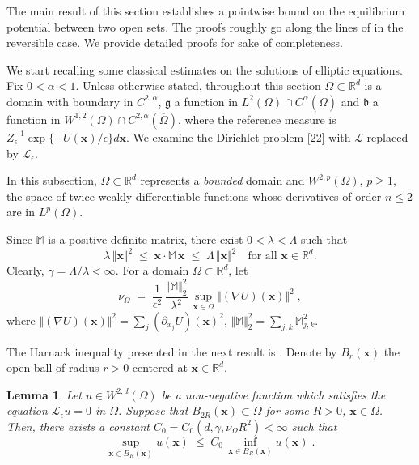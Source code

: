 \documentclass[reqno]{amsart}
\newtheorem{lemma}[theorem]{Lemma}
\newcounter{as}[section]
\newcommand{\mc}[1]{{\mathcal #1}}
\newcommand{\mf}[1]{{\mathfrak #1}}
\newcommand{\bb}[1]{{\mathbb #1}}
\newcommand{\bs}[1]{{\boldsymbol #1}}
\newcommand{\<}{\langle}
\renewcommand{\>}{\rangle}
\begin{document}
The main result of this section establishes a pointwise bound on the equilibrium potential between two open sets. The proofs roughly go along the lines of \cite{BEGK1} in the reversible case. We provide detailed proofs for sake of completeness.

We start recalling some classical estimates on the solutions of
elliptic equations.  Fix $0<\alpha<1$. Unless otherwise stated,
throughout this section $\Omega\subset \bb R^d$ is a domain with
boundary in $C^{2,\alpha}$, $\mf g$ a function in $L^2(\Omega) \cap
C^{\alpha}(\overline{\Omega})$ and $\mf b$ a function in
$W^{1,2}(\Omega)\cap C^{2,\alpha}(\overline{\Omega})$, where the
reference measure is $Z^{-1}_\epsilon \exp\{-U(\bs{x})/\epsilon\}
d\bs{x}$. We examine the Dirichlet problem \eqref{22} with $\mc L$
replaced by $\mc L_\epsilon$.

\smallskip{}  In this
subsection, $\Omega\subset\bb R^d$ represents a {\sl bounded} domain and
$W^{2,p} (\Omega)$, $p\ge 1$, the space of twice weakly differentiable
functions whose derivatives of order $n\le 2$ are in $L^p(\Omega)$.

Since $\bb M$ is a positive-definite matrix, there exist $0<\lambda <
\Lambda$ such that
\begin{equation}
\label{7-5}
\lambda\, \Vert \bs x \Vert^2 \;\le\; \bs x \cdot \bb M \, \bs x
\;\le\; \Lambda\, \Vert \bs x \Vert^2 \quad
\text{for all $\bs x\in \bb R^d$.}
\end{equation}
Clearly, $\gamma=\Lambda/\lambda<\infty$.  For a domain $\Omega
\subset \bb R^d$, let
\begin{equation}
\label{7-1}
\nu_{\Omega} \;=\; \frac 1{\epsilon^2} \,
\frac{\Vert \bb M \Vert^2_2} {\lambda^2} \,
\sup_{\bs{x}\in \Omega} \Vert (\nabla U)(\bs x)\Vert^2 \;,
\end{equation}
where $\Vert (\nabla U)(\bs x)\Vert^2 = \sum_j (\partial_{x_j} U)(\bs
x)^2$, $\Vert \bb M \Vert^2_2 = \sum_{j,k} \bb M_{j,k}^2$.

The Harnack inequality presented in the next result is \cite[Corollary
9.25]{gt}. Denote by $B_{r}(\bs x)$ the open ball of radius $r>0$
centered at $\bs x\in\bb R^d$.


\begin{lemma}
\label{7-l4}
Let $u\in W^{2,d} (\Omega)$ be a non-negative function which satisfies
the equation $\mc L_\epsilon u = 0$ in $\Omega$. Suppose that
$B_{2R}(\bs x) \subset \Omega$ for some $R>0$, $\bs x\in\Omega$.
Then, there exists a constant $C_0 = C_0(d, \gamma, \nu_{\Omega}
R^2)<\infty$ such that
\begin{equation*}
\sup_{\bs x\in B_R(\bs x)} u(\bs x) \;\le\; C_0
\, \inf_{\bs x\in B_R(\bs x)} u(\bs x) \;.
\end{equation*}
\end{lemma}
\end{document}
